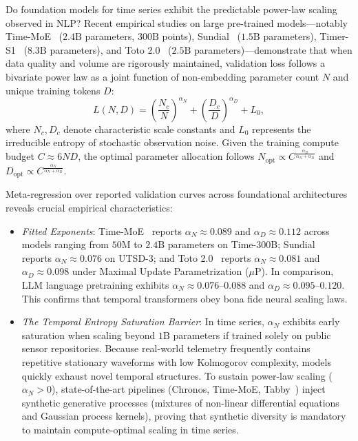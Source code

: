 Do foundation models for time series exhibit the predictable power-law scaling observed in NLP?
Recent empirical studies on large pre-trained models—notably Time-MoE~\cite{shi2024timemoe} ($2.4\text{B}$ parameters, $300\text{B}$ points), Sundial~\cite{thuml2025sundial} ($1.5\text{B}$ parameters), Timer-S1~\cite{thuml2026timers1} ($8.3\text{B}$ parameters), and Toto 2.0~\cite{datadog2026toto2} ($2.5\text{B}$ parameters)—demonstrate that when data quality and volume are rigorously maintained, validation loss follows a bivariate power law as a joint function of non-embedding parameter count $N$ and unique training tokens $D$:
\begin{equation}
    L(N, D) = \left( \frac{N_c}{N} \right)^{\alpha_N} + \left( \frac{D_c}{D} \right)^{\alpha_D} + L_0,
\end{equation}
where $N_c, D_c$ denote characteristic scale constants and $L_0$ represents the irreducible entropy of stochastic observation noise. Given the training compute budget $C \approx 6 N D$, the optimal parameter allocation follows $N_{\text{opt}} \propto C^{\frac{\alpha_D}{\alpha_N + \alpha_D}}$ and $D_{\text{opt}} \propto C^{\frac{\alpha_N}{\alpha_N + \alpha_D}}$.

Meta-regression over reported validation curves across foundational architectures reveals crucial empirical characteristics:
\begin{itemize}[leftmargin=*]
    \item \emph{Fitted Exponents}: Time-MoE~\cite{shi2024timemoe} reports $\alpha_N \approx 0.089$ and $\alpha_D \approx 0.112$ across models ranging from $50\text{M}$ to $2.4\text{B}$ parameters on Time-300B; Sundial~\cite{thuml2025sundial} reports $\alpha_N \approx 0.076$ on UTSD-3; and Toto 2.0~\cite{datadog2026toto2} reports $\alpha_N \approx 0.081$ and $\alpha_D \approx 0.098$ under Maximal Update Parametrization ($\mu\text{P}$). In comparison, LLM language pretraining exhibits $\alpha_N \approx 0.076$--$0.088$ and $\alpha_D \approx 0.095$--$0.120$. This confirms that temporal transformers obey bona fide neural scaling laws.
    \item \emph{The Temporal Entropy Saturation Barrier}: In time series, $\alpha_N$ exhibits early saturation when scaling beyond $1\text{B}$ parameters if trained solely on public sensor repositories. Because real-world telemetry frequently contains repetitive stationary waveforms with low Kolmogorov complexity, models quickly exhaust novel temporal structures. To sustain power-law scaling ($\alpha_N > 0$), state-of-the-art pipelines (Chronos, Time-MoE, Tabby~\cite{xie2026tabby}) inject synthetic generative processes (mixtures of non-linear differential equations and Gaussian process kernels), proving that synthetic diversity is mandatory to maintain compute-optimal scaling in time series.
\end{itemize}

